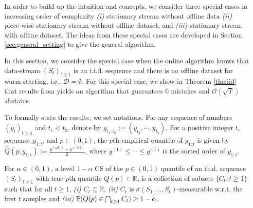 In order to build up the intuition and concepts, we consider three special cases in increasing order of complexity {\em (i)} stationary stream without offline data {\em (ii)} piece-wise stationary stream {without offline dataset}, and {\em (iii)} stationary stream with offline dataset. The  ideas from these special cases are developed in Section \ref{sec:general_setting} to give the general algorithm. 


In this section, we consider the special case when the online algorithm knows that data-stream $(S_t)_{t\geq 1}$ is an i.i.d. sequence and there is no offline dataset for warm-starting, i.e., $\mathcal{D} = \emptyset$. For this special case, we show in Theorem \ref{the:iid} that results from \cite{howard2022sequential} yields an algorithm that guarantees $0$ mistakes and $\mathcal{O}(\sqrt{T})$ abstains.

To formally state the results, we set notations. For any sequence of numbers $(y_t)_{t \geq 1}$ and $t_1 < t_2$, denote by $y_{t_1:t_2}:= (y_{t_1}, \cdots,y_{t_2})$. For a positive integer $t$, sequence $y_{1:t}$, and $p \in (0,1)$, the $p$th empirical quantile of $y_{1:t}$ is given by $\widehat{Q}(p; y_{1:t}) := \frac{y^{(\lfloor pt \rfloor)} + y^{(\lceil pt \rceil)}}{2}$, where $y^{(1)} \leq \cdots \leq y^{(t)}$ is the sorted order of $y_{1:t}$. 

\begin{definition} For $\alpha \in (0,1)$, a level $1-\alpha$ CS of the $p \in (0,1)$ quantile of an i.i.d. sequence $(S_t)_{t\geq 1}$ with true $p$th quantile $Q(p) \in \mathbb{R}$, is a collection of subsets $\{ C_t: t\geq 1\}$ such that for all $t\geq 1$, {\em(i)} $C_t \subseteq \mathbb{R}$,  {\em (ii)}  $C_t$ is $\sigma(S_1, \ldots, S_t)$-measurable w.r.t. the first $t$ samples  and {\em (iii)} ${\mathbb{P}}( Q(p) \in \bigcap_{t \geq 1} C_t) \geq 1-\alpha$.
\label{defn:CS}
\end{definition}

